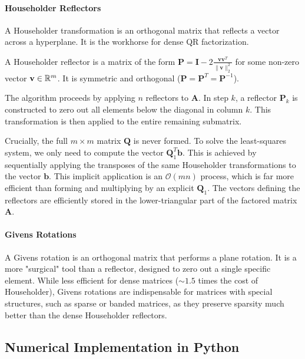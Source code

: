 \paragraph{Householder Reflectors}
A Householder transformation is an orthogonal matrix that reflects a vector across a hyperplane. It is the workhorse for dense QR factorization. 

\begin{definition}
A Householder reflector is a matrix of the form $\mathbf{P} = \mathbf{I} - 2 \frac{\mathbf{v}\mathbf{v}^T}{\|\mathbf{v}\|_2^2}$ for some non-zero vector $\mathbf{v} \in \mathbb{R}^m$. It is symmetric and orthogonal ($\mathbf{P} = \mathbf{P}^T = \mathbf{P}^{-1}$).
\end{definition}

The algorithm proceeds by applying $n$ reflectors to $\mathbf{A}$. In step $k$, a reflector $\mathbf{P}_k$ is constructed to zero out all elements below the diagonal in column $k$. This transformation is then applied to the entire remaining submatrix.

\begin{remark}[Implicit Q]
Crucially, the full $m \times m$ matrix $\mathbf{Q}$ is never formed. To solve the least-squares system, we only need to compute the vector $\mathbf{Q}_1^T\mathbf{b}$. This is achieved by sequentially applying the transposes of the same Householder transformations to the vector $\mathbf{b}$. This implicit application is an $\mathcal{O}(mn)$ process, which is far more efficient than forming and multiplying by an explicit $\mathbf{Q}_1$. The vectors defining the reflectors are efficiently stored in the lower-triangular part of the factored matrix $\mathbf{A}$.
\end{remark}

\paragraph{Givens Rotations}
A Givens rotation is an orthogonal matrix that performs a plane rotation. It is a more "surgical" tool than a reflector, designed to zero out a single specific element. While less efficient for dense matrices ($\sim 1.5$ times the cost of Householder), Givens rotations are indispensable for matrices with special structures, such as sparse or banded matrices, as they preserve sparsity much better than the dense Householder reflectors. 

\subsection{Numerical Implementation in Python}

